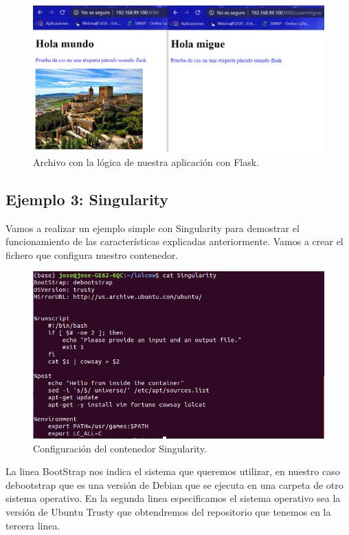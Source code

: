 \documentclass[11pt,a4paper]{article}
\begin{document}
\begin{figure}[H]
	\centering
	\includegraphics[scale=0.5]{images/E3_comprobacion.PNG}
	\caption[Comprobacion]{Archivo con la lógica de nuestra aplicación con Flask.}
	\label{fig:comprobacion}
\end{figure}
\newpage

\subsection{Ejemplo 3: Singularity}
Vamos a realizar un ejemplo simple con Singularity para demostrar el funcionamiento de las características explicadas anteriormente.
Vamos a crear el fichero que configura nuestro contenedor.
\begin{figure}[H]
	\centering
	\includegraphics[scale=0.5]{images/configuracionSin.png}
	\caption[Configuración Singularity]{Configuración del contenedor Singularity.}
	\label{fig:configuracionSin}
\end{figure}

La linea BootStrap nos indica el sistema que queremos utilizar, en nuestro caso debootstrap que es una versión de Debian que se ejecuta en una carpeta de otro sistema operativo. En la segunda linea especificamos el sistema operativo sea la versión de Ubuntu Trusty que obtendremos del repositorio que tenemos en la tercera linea. 
\end{document}
